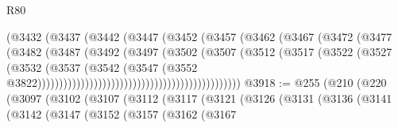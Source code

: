 \begin{lexlean}{R80}
\begin{coremodule}
                                                (@3432
                                                  (@3437
                                                    (@3442
                                                      (@3447
                                                        (@3452
                                                          (@3457
                                                            (@3462
                                                              (@3467
                                                                (@3472
                                                                  (@3477
                                                                    (@3482
                                                                      (@3487
                                                                        (@3492
                                                                          (@3497
                                                                            (@3502
                                                                              (@3507
                                                                                (@3512
                                                                                  (@3517
                                                                                    (@3522
                                                                                      (@3527
                                                                                        (@3532
                                                                                          (@3537
                                                                                            (@3542
                                                                                              (@3547
                                                                                                (@3552
                                                                                                  @3822)))))))))))))))))))))))))))))))))))))))))))))))
@3918 := @255
    (@210
      (@220
        (@3097
          (@3102
            (@3107
              (@3112
                (@3117
                  (@3121
                    (@3126
                      (@3131
                        (@3136
                          (@3141
                            (@3142
                              (@3147
                                (@3152
                                  (@3157
                                    (@3162
                                      (@3167

\end{coremodule}
\end{lexlean}
